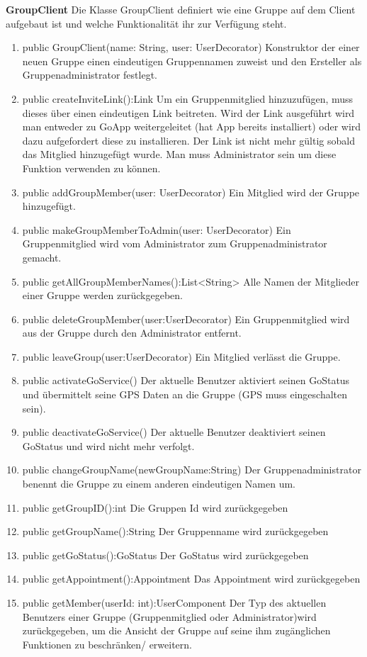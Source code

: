 \textbf{GroupClient}
Die Klasse GroupClient definiert wie eine Gruppe auf dem Client aufgebaut ist und welche Funktionalität ihr zur Verfügung steht.
\begin{enumerate}
	\item public GroupClient(name: String, user: UserDecorator)
		Konstruktor der einer neuen Gruppe einen eindeutigen Gruppennamen zuweist und den Ersteller als Gruppenadministrator festlegt.
	\item public createInviteLink():Link
		Um ein Gruppenmitglied hinzuzufügen, muss dieses über einen eindeutigen Link beitreten. Wird der Link ausgeführt wird man entweder zu GoApp weitergeleitet (hat App bereits installiert) oder wird dazu aufgefordert diese zu installieren. Der Link ist nicht mehr gültig sobald das Mitglied hinzugefügt wurde. Man muss Administrator sein um diese Funktion verwenden zu können.
	\item public addGroupMember(user: UserDecorator)
		Ein Mitglied wird der Gruppe hinzugefügt.
	\item public makeGroupMemberToAdmin(user: UserDecorator)
		Ein Gruppenmitglied wird vom Administrator zum Gruppenadministrator gemacht.
	\item public getAllGroupMemberNames():List<String>
		Alle Namen der Mitglieder einer Gruppe werden zurückgegeben.
	\item public deleteGroupMember(user:UserDecorator)
		Ein Gruppenmitglied wird aus der Gruppe durch den Administrator entfernt.
	\item public leaveGroup(user:UserDecorator)
		Ein Mitglied verlässt die Gruppe.
	\item public activateGoService()
		Der aktuelle Benutzer aktiviert seinen GoStatus und übermittelt seine GPS Daten an die Gruppe (GPS muss eingeschalten sein).
	\item public deactivateGoService()
		Der aktuelle Benutzer deaktiviert seinen GoStatus und wird nicht mehr verfolgt.
	\item public changeGroupName(newGroupName:String)
		Der Gruppenadministrator benennt die Gruppe zu einem anderen eindeutigen Namen um.
	\item public getGroupID():int 
		Die Gruppen Id wird zurückgegeben
	\item public getGroupName():String
		Der Gruppenname wird zurückgegeben 
	\item public getGoStatus():GoStatus 
		Der GoStatus wird zurückgegeben
	\item public getAppointment():Appointment 
		Das Appointment wird zurückgegeben
	\item public getMember(userId: int):UserComponent 
		Der Typ des aktuellen Benutzers einer Gruppe (Gruppenmitglied oder Administrator)wird zurückgegeben, um die Ansicht der Gruppe auf seine ihm zugänglichen Funktionen zu beschränken/ erweitern.
\end{enumerate}

